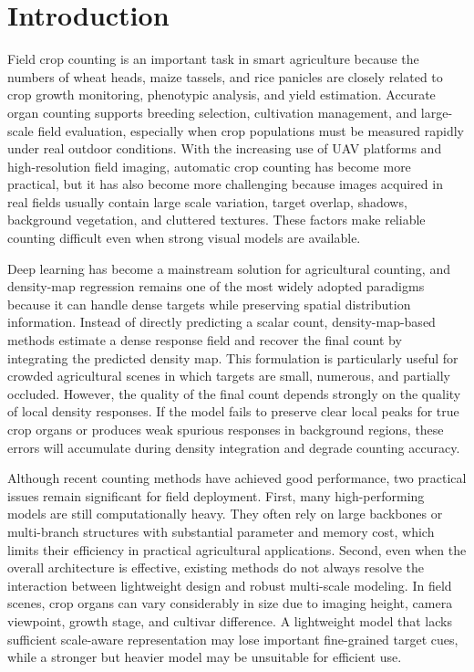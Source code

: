 \documentclass[a4paper,fleqn]{cas-sc}
\begin{document}
\maketitle

\section{Introduction}
\linenumbers

Field crop counting is an important task in smart agriculture because the numbers of wheat heads, maize tassels, and rice panicles are closely related to crop growth monitoring, phenotypic analysis, and yield estimation. Accurate organ counting supports breeding selection, cultivation management, and large-scale field evaluation, especially when crop populations must be measured rapidly under real outdoor conditions. With the increasing use of UAV platforms and high-resolution field imaging, automatic crop counting has become more practical, but it has also become more challenging because images acquired in real fields usually contain large scale variation, target overlap, shadows, background vegetation, and cluttered textures. These factors make reliable counting difficult even when strong visual models are available.

Deep learning has become a mainstream solution for agricultural counting, and density-map regression remains one of the most widely adopted paradigms because it can handle dense targets while preserving spatial distribution information. Instead of directly predicting a scalar count, density-map-based methods estimate a dense response field and recover the final count by integrating the predicted density map. This formulation is particularly useful for crowded agricultural scenes in which targets are small, numerous, and partially occluded. However, the quality of the final count depends strongly on the quality of local density responses. If the model fails to preserve clear local peaks for true crop organs or produces weak spurious responses in background regions, these errors will accumulate during density integration and degrade counting accuracy.

Although recent counting methods have achieved good performance, two practical issues remain significant for field deployment. First, many high-performing models are still computationally heavy. They often rely on large backbones or multi-branch structures with substantial parameter and memory cost, which limits their efficiency in practical agricultural applications. Second, even when the overall architecture is effective, existing methods do not always resolve the interaction between lightweight design and robust multi-scale modeling. In field scenes, crop organs can vary considerably in size due to imaging height, camera viewpoint, growth stage, and cultivar difference. A lightweight model that lacks sufficient scale-aware representation may lose important fine-grained target cues, while a stronger but heavier model may be unsuitable for efficient use.
\end{document}

